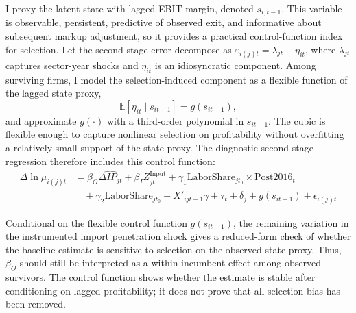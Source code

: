 \documentclass[12pt]{article}
\begin{document}
I proxy the latent state with lagged EBIT margin, denoted $s_{i,t-1}$. This variable is observable, persistent, predictive of observed exit, and informative about subsequent markup adjustment, so it provides a practical control-function index for selection. Let the second-stage error decompose as $\varepsilon_{i(j)t} = \lambda_{jt} + \eta_{it}$, where $\lambda_{jt}$ captures sector-year shocks and $\eta_{it}$ is an idiosyncratic component. Among surviving firms, I model the selection-induced component as a flexible function of the lagged state proxy,
\[
\mathbb{E}[\eta_{it} \mid s_{it-1}] = g(s_{it-1}),
\]
and approximate $g(\cdot)$ with a third-order polynomial in $s_{it-1}$. The cubic is flexible enough to capture nonlinear selection on profitability without overfitting a relatively small support of the state proxy. The diagnostic second-stage regression therefore includes this control function:
\begin{equation}
\begin{aligned}
\Delta \ln \mu_{i(j)t} &= \beta_O \widehat{\Delta IP_{jt}} + \beta_I Z_{jt}^{\text{Input}} + \gamma_1 \text{LaborShare}_{jt_0} \times \text{Post2016}_t \\
&\quad + \gamma_2 \text{LaborShare}_{jt_0} + X'_{ijt-1} \gamma + \tau_t + \delta_j + g(s_{it-1}) + \epsilon_{i(j)t}
\end{aligned}
\end{equation}

Conditional on the flexible control function $g(s_{it-1})$, the remaining variation in the instrumented import penetration shock gives a reduced-form check of whether the baseline estimate is sensitive to selection on the observed state proxy. Thus, $\beta_O$ should still be interpreted as a within-incumbent effect among observed survivors. The control function shows whether the estimate is stable after conditioning on lagged profitability; it does not prove that all selection bias has been removed.
\end{document}
